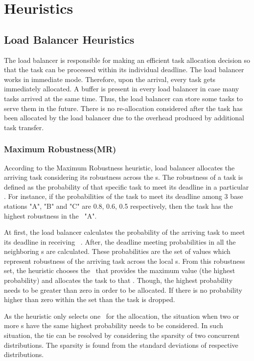 \section{Heuristics}\label{sec:heuristcic}
\subsection{\textbf{Load Balancer Heuristics}}
The load balancer is responsible for making an efficient task allocation decision so that the task can be processed within its individual deadline. The load balancer works in immediate mode. Therefore, upon the arrival, every task gets immediately allocated.  A buffer is present in every load balancer in case many tasks arrived at the same time. Thus, the load balancer can store some tasks to serve them in the future. There is no re-allocation considered after the task has been allocated by the load balancer due to the overhead produced by additional task transfer.

\subsubsection{Maximum Robustness(MR)}
According to the Maximum Robustness heuristic, load balancer allocates the arriving task considering its robustness across the \bs s. The robustness of a task is defined as the probability of that specific task to meet its deadline in a particular \bs. For instance, if the probabilities of the task to meet its deadline among 3 base stations "A", "B" and "C" are 0.8, 0.6, 0.5 respectively, then the task has the highest robustness in the \bs~"A".  

At first, the load balancer calculates the probability of the arriving task to meet its deadline in receiving \bs~. After, the deadline meeting probabilities in all the neighboring \bs s are calculated. These probabilities are the set of values which represent robustness of the arriving task across the local \bs s. From this robustness set, the heuristic chooses the \bs~that provides the maximum value (the highest probability) and allocates the task to that \bs. Though, the highest probability needs to be greater than zero in order to be allocated. If there is no probability higher than zero within the set than the task is dropped.

As the heuristic only selects one \bs~for the allocation, the situation when two or more \bs s have the same highest probability needs to be considered. In such situation, the tie can be resolved by considering the sparsity of two concurrent distributions. The sparsity is found from the standard deviations of respective distributions.%
 

